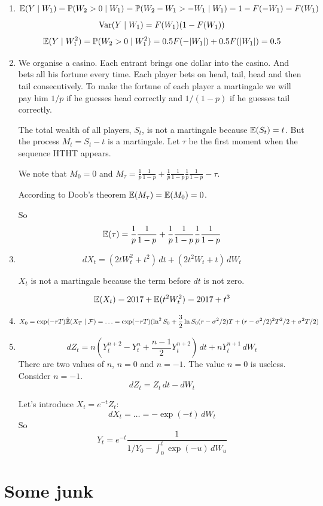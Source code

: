 \documentclass[12pt, a4paper]{article}
\newcommand{\cF}{\mathcal{F}}
\DeclarePairedDelimiter{\abs}{\lvert}{\rvert}
\begin{document}
\begin{enumerate}
  \item
    \[
      \operatorname{\mathbb{E}}(Y \mid W_1) = \operatorname{\mathbb{P}}(W_2 > 0  \mid W_1)=\operatorname{\mathbb{P}}(W_2 - W_1 > -W_1 \mid W_1)= 1 - F(-W_1)=F(W_1)
    \]
    \[
      \operatorname{Var}(Y \mid W_1) = F(W_1)(1-F(W_1))
    \]
    \[
      \E(Y \mid W_1^2)=\P(W_2 > 0 \mid W_1^2)=0.5F(-\abs{W_1})+0.5F(\abs{W_1})=0.5
    \]
  \item We organise a casino.
    Each entrant brings one dollar into the casino.
    And bets all his fortune every time.
    Each player bets on head, tail, head and then tail consecutively.
    To make the fortune of each player a martingale we will pay him
    $1/p$ if he guesses head correctly and $1/(1-p)$ if he guesses tail correctly.

    The total wealth of all players, $S_t$,
    is not a martingale because $\operatorname{\mathbb{E}}(S_t)=t$.
    But the process $M_t = S_t - t$ is a martingale.
    Let $\tau$ be the first moment when the sequence HTHT appears.

    We note that $M_0 = 0$ and $M_{\tau}=\frac{1}{p}\frac{1}{1-p} + \frac{1}{p}\frac{1}{1-p}\frac{1}{p}\frac{1}{1-p}-\tau$.

    According to Doob's theorem $\operatorname{\mathbb{E}}(M_{\tau})=\operatorname{\mathbb{E}}(M_0)=0$.

    So
    \[
      \operatorname{\mathbb{E}}(\tau) = \frac{1}{p}\frac{1}{1-p} + \frac{1}{p}\frac{1}{1-p}\frac{1}{p}\frac{1}{1-p}
    \]
  \item
    \[
      dX_t = (2tW_t^2 + t^2) \, dt + (2t^2 W_t + t) \, dW_t
    \]

    $X_t$ is not a martingale because the term before $dt$ is not zero.

    \[
      \operatorname{\mathbb{E}}(X_t) = 2017 + \operatorname{\mathbb{E}}(t^2 W_t^2) = 2017 + t^3
    \]
  \item
    \[
 X_0 = \exp(-rT) \tilde{\E}(X_T \mid \cF) = \ldots =
 \exp(-rT)(\ln^2 S_0 + \frac{3}{2}\ln S_0 (r-\sigma^2/2)T  + (r-\sigma^2/2)^2T^2/2 + \sigma^2 T/2 )
    \]
  \item
    \[
dZ_t = n(Y_t^{n+2} - Y_t^n + \frac{n-1}{2}Y_t^{n+2}) \, dt + n Y_t^{n+1} \, dW_t
\]
There are two values of $n$, $n=0$ and $n=-1$.
The value $n=0$ is useless.
Consider $n=-1$.
\[
  dZ_t = Z_t \, dt - dW_t
\]

Let's introduce $X_t = e^{-t} Z_t$:
\[
  dX_t = \ldots = -\exp(-t) \, dW_t
\]
So
\[
  Y_t = e^{-t}\frac{1}{1/Y_0 - \int_0^t\exp(-u) \, dW_u}
\]

\end{enumerate}


\section{Some junk}
\end{document}
